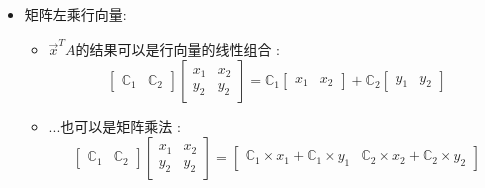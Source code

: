 \documentclass[UTF8,12pt]{ctexbook}
\newcommand{\mathConstant}{\mathbb{C}}
\newcommand{\transpose}{^T}
\begin{document}
{{{{{\begin{itemize}
{\begin{itemize}
{$$\begin{bmatrix}
                        x_{11} \\
                        x_{21}
                      \end{bmatrix}
                      =
                      \begin{bmatrix}
                        a_{11} \times x_{11} + a_{12} \times x_{21} \\
                        a_{21} \times x_{11} + a_{22} \times x_{21}
                      \end{bmatrix}
                    $$
                    }
            \end{itemize}
            }
      \item {
            矩阵左乘行向量:
            \begin{itemize}
              \item {
                    $\vec{x}\transpose A$的结果可以是行向量的线性组合 :
                    $$
                      \begin{bmatrix}
                        \mathConstant_1 & \mathConstant_2
                      \end{bmatrix}
                      \begin{bmatrix}
                        x_1 & x_2 \\
                        y_2 & y_2
                      \end{bmatrix}
                      =
                      \mathConstant_1\begin{bmatrix}
                        x_1 & x_2
                      \end{bmatrix}
                      +
                      \mathConstant_2\begin{bmatrix}
                        y_1 & y_2
                      \end{bmatrix}
                    $$
                    }
              \item {
                    ...也可以是矩阵乘法 :
                    $$
                      \begin{bmatrix}
                        \mathConstant_1 & \mathConstant_2
                      \end{bmatrix}
                      \begin{bmatrix}
                        x_1 & x_2 \\
                        y_2 & y_2
                      \end{bmatrix}
                      =
                      \begin{bmatrix}
                        \mathConstant_1 \times x_1 + \mathConstant_1 \times y_1 & \mathConstant_2 \times x_2 + \mathConstant_2 \times y_2
                      \end{bmatrix}
                    $$
                    }
            \end{itemize}
            }
    \end{itemize}
  }%

}}}}
\end{document}
